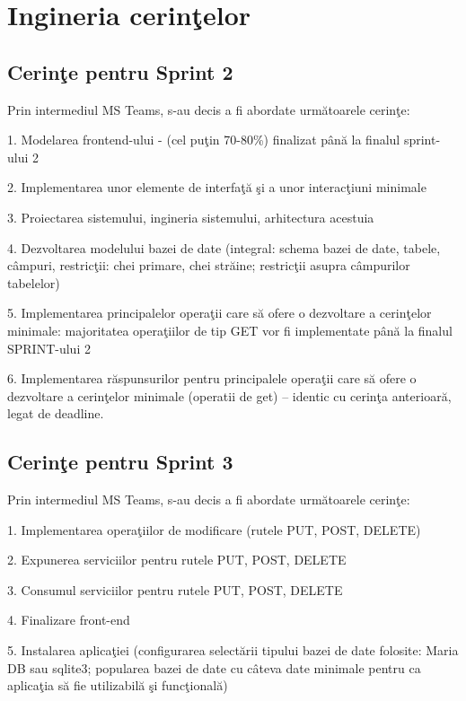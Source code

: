\documentclass{report}
\begin{document}
\section{Ingineria cerin\c telor}

\subsection{Cerin\c te pentru Sprint 2}

Prin intermediul MS Teams, s-au decis a fi abordate următoarele cerin\c te:

1. Modelarea frontend-ului - (cel pu\c tin 70-80\%) finalizat până la finalul sprint-ului 2

2. Implementarea unor elemente de interfa\c tă \c si a unor interac\c tiuni minimale

3. Proiectarea sistemului, ingineria sistemului, arhitectura acestuia

4. Dezvoltarea modelului bazei de date (integral: schema bazei de date, tabele, câmpuri, restric\c tii: chei primare, chei străine; restric\c tii asupra câmpurilor tabelelor)

5. Implementarea principalelor opera\c tii care să ofere o dezvoltare a cerin\c telor minimale: majoritatea opera\c tiilor de tip GET vor fi implementate până la finalul SPRINT-ului 2

6. Implementarea răspunsurilor pentru principalele opera\c tii care să ofere o dezvoltare a cerin\c telor minimale (operatii de get) – identic cu cerin\c ta anterioară, legat de deadline.

\subsection{Cerin\c te pentru Sprint 3}

Prin intermediul MS Teams, s-au decis a fi abordate următoarele cerin\c te:

1. Implementarea opera\c tiilor de modificare (rutele PUT, POST, DELETE)

2. Expunerea serviciilor pentru rutele PUT, POST, DELETE

3. Consumul serviciilor pentru rutele PUT, POST, DELETE

4. Finalizare front-end

5. Instalarea aplica\c tiei (configurarea selectării tipului bazei de date folosite: Maria DB sau sqlite3; popularea bazei de date cu câteva date minimale pentru ca aplica\c tia să fie utilizabilă \c si func\c tională)
\end{document}
